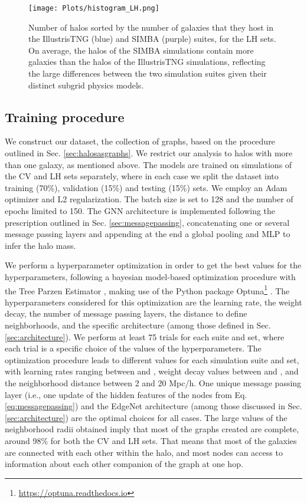 \documentclass[twocolumn]{aastex631}
\begin{document}
\begin{figure}[t!]
\begin{center}
\texttt{[image: Plots/histogram\_LH.png]}
\caption{Number of halos sorted by the number of galaxies that they host in the IllustrisTNG (blue) and SIMBA (purple) suites, for the LH sets. On average, the halos of the SIMBA simulations contain more galaxies than the halos of the IllustrisTNG simulations, reflecting the large differences between the two simulation suites given their distinct subgrid physics models.}
\label{fig:histogram}
\end{center}
\end{figure}

\subsection{Training procedure}
\label{sec:training}


We construct our dataset, the collection of graphs, based on the procedure outlined in Sec. \ref{sec:halosasgraphs}. We restrict our analysis to halos with more than one galaxy, as mentioned above. The models are trained on simulations of the CV and LH sets separately, where in each case we split the dataset into training (70\%), validation (15\%) and testing (15\%) sets. We employ an Adam optimizer \citep{kingma2014method} and L2 regularization. The batch size is set to 128 and the number of epochs limited to 150. The GNN architecture is implemented following the prescription outlined in Sec. \ref{sec:messagepassing}, concatenating one or several message passing layers and appending at the end a global pooling and MLP to infer the halo mass.

We perform a hyperparameter optimization in order to get the best values for the hyperparameters, following a bayesian model-based optimization procedure with the Tree Parzen Estimator \citep[TPE,][]{NIPS2011_86e8f7ab}, making use of the Python package Optuna\footnote{\url{https://optuna.readthedocs.io}} \citep{2019arXiv190710902A}. The hyperparameters considered for this optimization are the learning rate, the weight decay, the number of message passing layers, the distance to define neighborhoods, and the specific architecture (among those defined in Sec. \ref{sec:architecture}). We perform at least 75 trials for each suite and set, where each trial is a specific choice of the values of the hyperparameters. The optimization procedure leads to different values for each simulation suite and set, with learning rates ranging between  and , weight decay values between  and , and the neighborhood distance  between 2 and 20 Mpc/h. One unique message passing layer (i.e., one update of the hidden features of the nodes from Eq. \ref{eq:messagepassing}) and the EdgeNet architecture (among those discussed in Sec. \ref{sec:architecture}) are the optimal choices for all cases. The large values of the neighborhood radii obtained imply that most of the graphs created are complete, around 98\% for both the CV and LH sets. That means that most of the galaxies are connected with each other within the halo, and most nodes can access to information about each other companion of the graph at one hop. 
\end{document}
